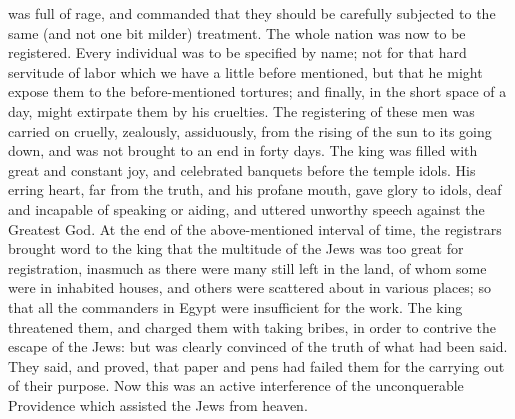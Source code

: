 {was full of rage, and commanded that they should be carefully subjected to the same (and not one bit milder) treatment.
The whole nation was now to be registered. Every individual was to be specified by name; not for that hard servitude of labor which we have a little before mentioned, but that he might expose them to the before-mentioned tortures; and finally, in the short space of a day, might extirpate them by his cruelties.
The registering of these men was carried on cruelly, zealously, assiduously, from the rising of the sun to its going down, and was not brought to an end in forty days.
The king was filled with great and constant joy, and celebrated banquets before the temple idols. His erring heart, far from the truth, and his profane mouth, gave glory to idols, deaf and incapable of speaking or aiding, and uttered unworthy speech against the Greatest God.
At the end of the above-mentioned interval of time, the registrars brought word to the king that the multitude of the Jews was too great for registration,
inasmuch as there were many still left in the land, of whom some were in inhabited houses, and others were scattered about in various places; so that all the commanders in Egypt were insufficient for the work.
The king threatened them, and charged them with taking bribes, in order to contrive the escape of the Jews: but was clearly convinced of the truth of what had been said.
They said, and proved, that paper and pens had failed them for the carrying out of their purpose.
Now this was an active interference of the unconquerable Providence which assisted the Jews from heaven.

}
